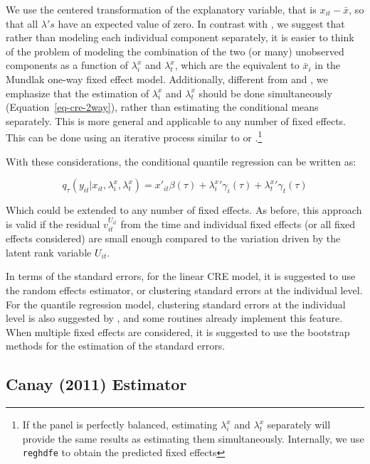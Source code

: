 \documentclass[bib]{statapress}
\begin{document}
We use the centered transformation of the explanatory variable, that is
\(x_{it}-\bar x\), so that all \(\lambda's\) have an expected value of
zero. In contrast with \citet{baltagi2023}, we suggest that rather than
modeling each individual component separately, it is easier to think of
the problem of modeling the combination of the two (or many) unobserved
components as a function of \(\lambda_i^x\) and \(\lambda_t^x\), which
are the equivalent to \(\bar x_i\) in the Mundlak one-way fixed effect
model. Additionally, different from \citet{wooldridge2021} and
\citet{baltagi2023}, we emphasize that the estimation of \(\lambda_i^x\)
and \(\lambda_t^x\) should be done simultaneously
(Equation~\ref{eq-cre-2way}), rather than estimating the conditional
means separately. This is more general and applicable to any number of
fixed effects. This can be done using an iterative process similar to
\citet{rios2015} or \citet{correia_feasible_nodate}.\footnote{If the
  panel is perfectly balanced, estimating \(\lambda_i^x\) and
  \(\lambda_t^x\) separately will provide the same results as estimating
  them simultaneously. Internally, we use
  \citet{correia_feasible_nodate} \texttt{reghdfe} to obtain the
  predicted fixed effects}

With these considerations, the conditional quantile regression can be
written as:

\[q_\tau(y_{it}|x_{it},\lambda_i^x,\lambda_t^x)=x'_{it}\beta(\tau)+{\lambda^x_i}'\gamma_i(\tau)
+{\lambda^x_t}'\gamma_t(\tau)  
\]

Which could be extended to any number of fixed effects. As before, this
approach is valid if the residual \(v^{U_{it}}_{it}\) from the time and
individual fixed effects (or all fixed effects considered) are small
enough compared to the variation driven by the latent rank variable
\(U_{it}\).

In terms of the standard errors, for the linear CRE model, it is
suggested to use the random effects estimator, or clustering standard
errors at the individual level. For the quantile regression model,
clustering standard errors at the individual level is also suggested by
\citet{wooldridge2010}, and some routines already implement this
feature. When multiple fixed effects are considered, it is suggested to
use the bootstrap methods for the estimation of the standard errors.

\subsection{Canay (2011) Estimator}\label{sec-canay}
\end{document}
